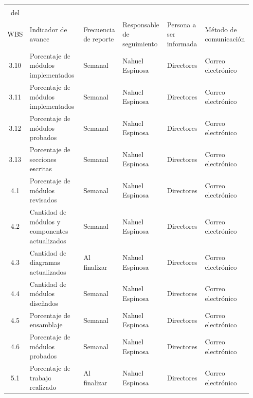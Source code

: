 \documentclass[11pt]{charter}
\begin{document}
\begin{table}[!htpb]
\centering
\begin{tabularx}{\linewidth}{@{}|c|m{3.5cm}|X|X|X|X|@{}}
\hline
\rowcolor[HTML]{C0C0C0} 
\multicolumn{6}{|c|}{\cellcolor[HTML]{C0C0C0}SEGUIMIENTO DE AVANCE} \\ \hline
\rowcolor[HTML]{C0C0C0} 
\cellcolor[HTML]{C0C0C0}\begin{tabular}[c]{@{}c@{}}Tarea\\del\\WBS\end{tabular} & Indicador de avance & Frecuencia de reporte & Responsable de seguimiento & Persona a ser informada & Método de comunicación \\ \hline
 3.10 & Porcentaje de módulos implementados              & Semanal      & Nahuel Espinosa & Directores & Correo electrónico \\ \hline
 3.11 & Porcentaje de módulos implementados              & Semanal      & Nahuel Espinosa & Directores & Correo electrónico \\ \hline
 3.12 & Porcentaje de módulos probados                   & Semanal      & Nahuel Espinosa & Directores & Correo electrónico \\ \hline
 3.13 & Porcentaje de secciones escritas                 & Semanal      & Nahuel Espinosa & Directores & Correo electrónico \\ \hline
 4.1  & Porcentaje de módulos revisados                  & Semanal      & Nahuel Espinosa & Directores & Correo electrónico \\ \hline
 4.2  & Cantidad de módulos y componentes actualizados   & Semanal      & Nahuel Espinosa & Directores & Correo electrónico \\ \hline
 4.3  & Cantidad de diagramas actualizados               & Al finalizar & Nahuel Espinosa & Directores & Correo electrónico \\  \hline
 4.4  & Cantidad de módulos diseñados                    & Semanal      & Nahuel Espinosa & Directores & Correo electrónico \\ \hline
 4.5  & Porcentaje de ensamblaje                         & Semanal      & Nahuel Espinosa & Directores & Correo electrónico \\  \hline
 4.6  & Porcentaje de módulos probados                   & Semanal      & Nahuel Espinosa & Directores & Correo electrónico \\ \hline
 5.1  & Porcentaje de trabajo realizado                  & Al finalizar & Nahuel Espinosa & Directores & Correo electrónico \\ \hline

\end{tabularx}
\end{table}
\end{document}
